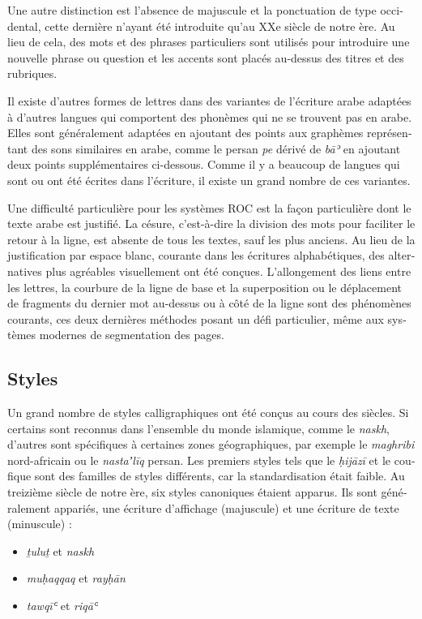 \begin{french}
Une autre distinction est l'absence de majuscule et la ponctuation de type
occidental, cette dernière n'ayant été introduite qu'au XXe siècle de notre
ère. Au lieu de cela, des mots et des phrases particuliers sont utilisés pour
introduire une nouvelle phrase ou question et les accents sont placés au-dessus
des titres et des rubriques.

Il existe d'autres formes de lettres dans des variantes de l'écriture arabe
adaptées à d'autres langues qui comportent des phonèmes qui ne se trouvent pas
en arabe. Elles sont généralement adaptées en ajoutant des points aux graphèmes
représentant des sons similaires en arabe, comme le persan \emph{pe} dérivé de
\emph{bāʾ} en ajoutant deux points supplémentaires ci-dessous. Comme il y a
beaucoup de langues qui sont ou ont été écrites dans l'écriture, il existe un
grand nombre de ces variantes.

Une difficulté particulière pour les systèmes ROC est la façon particulière
dont le texte arabe est justifié. La césure, c'est-à-dire la division des mots
pour faciliter le retour à la ligne, est absente de tous les textes, sauf les
plus anciens. Au lieu de la justification par espace blanc, courante dans les
écritures alphabétiques, des alternatives plus agréables visuellement ont été
conçues.  L'allongement des liens entre les lettres, la courbure de la ligne de
base et la superposition ou le déplacement de fragments du dernier mot
au-dessus ou à côté de la ligne sont des phénomènes courants, ces deux
dernières méthodes posant un défi particulier, même aux systèmes modernes de
segmentation des pages.

\subsection{Styles}

Un grand nombre de styles calligraphiques ont été conçus au cours des siècles.
Si certains sont reconnus dans l'ensemble du monde islamique, comme le
\emph{naskh}, d'autres sont spécifiques à certaines zones géographiques, par
exemple le \emph{maghribi} nord-africain ou le \emph{nastaʼlīq} persan. Les
premiers styles tels que le \emph{ḥijāzī} et le coufique sont des familles de
styles différents, car la standardisation était faible. Au treizième siècle de
notre ère, six styles canoniques étaient apparus. Ils sont généralement
appariés, une écriture d'affichage (majuscule) et une écriture de texte
(minuscule) :

\begin{itemize}
        \item \emph{ṯuluṯ} et \emph{naskh}
        \item \emph{muḥaqqaq} et \emph{rayḥān}
        \item \emph{tawqīʿ} et \emph{riqāʿ}
\end{itemize}


\end{french}
